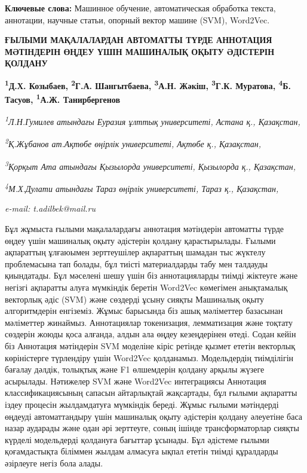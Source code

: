 {\bfseries Ключевые слова:} Машинное обучение, автоматическая обработка
текста, аннотации, научные статьи, опорный вектор машине (SVM),
Word2Vec.

\begin{articleheader}
{\bfseries ҒЫЛЫМИ МАҚАЛАЛАРДАН АВТОМАТТЫ ТҮРДЕ АННОТАЦИЯ МӘТІНДЕРІН ӨҢДЕУ ҮШІН МАШИНАЛЫҚ ОҚЫТУ ӘДІСТЕРІН ҚОЛДАНУ}

{\bfseries
\textsuperscript{1}Д.Х. Козыбаев,
\textsuperscript{2}Г.А. Шангытбаева,
\textsuperscript{3}А.Н. Жәкіш,
\textsuperscript{3}Г.К. Муратова,
\textsuperscript{4}Б. Тасуов,
\textsuperscript{1}А.Ж. Танирбергенов\textsuperscript{\envelope }}
\end{articleheader}

\begin{affiliation}
\emph{\textsuperscript{1}Л.Н.Гумилев атындағы Еуразия ұлттық университеті, Астана қ., Қазақстан,}

\emph{\textsuperscript{2}Қ.Жұбанов ат.Ақтөбе өңірлік университеті, Ақтөбе қ., Қазақстан,}

\emph{\textsuperscript{3}Қорқыт Ата атындағы Қызылорда университеті, Қызылорда қ., Қазақстан,}

\emph{\textsuperscript{4}М.Х.Дулати атындағы Тараз өңірлік университеті, Тараз қ., Қазақстан,}

\emph{e-mail: t.adilbek@mail.ru}
\end{affiliation}

Бұл жұмыста ғылыми мақалалардағы аннотация мәтіндерін автоматты түрде
өңдеу үшін машиналық оқыту әдістерін қолдану қарастырылады. Ғылыми
ақпараттың ұлғаюымен зерттеушілер ақпараттың шамадан тыс жүктелу
проблемасына тап болады, бұл тиісті материалдарды табу мен талдауды
қиындатады. Бұл мәселені шешу үшін біз аннотацияларды тиімді жіктеуге
және негізгі ақпаратты алуға мүмкіндік беретін Word2Vec көмегімен
анықтамалық векторлық әдіс (SVM) және сөздерді ұсыну сияқты Машиналық
оқыту алгоритмдерін енгіземіз. Жұмыс барысында біз ашық мәліметтер
базасынан мәліметтер жинаймыз. Аннотациялар токенизация, лемматизация
және тоқтату сөздерін жоюды қоса алғанда, алдын ала өңдеу кезеңдерінен
өтеді. Содан кейін біз Аннотация мәтіндерін SVM моделіне кіріс ретінде
қызмет ететін векторлық көріністерге түрлендіру үшін Word2Vec
қолданамыз. Модельдердің тиімділігін бағалау дәлдік, толықтық және F1
өлшемдерін қолдану арқылы жүзеге асырылады. Нәтижелер SVM және Word2Vec
интеграциясы Аннотация классификациясының сапасын айтарлықтай
жақсартады, бұл ғылыми ақпаратты іздеу процесін жылдамдатуға мүмкіндік
береді. Жұмыс ғылыми мәтіндерді өңдеуді автоматтандыру үшін машиналық
оқыту әдістерін қолдану әлеуетіне баса назар аударады және одан әрі
зерттеуге, соның ішінде трансформаторлар сияқты күрделі модельдерді
қолдануға бағыттар ұсынады. Бұл әдістеме ғылыми қоғамдастықта біліммен
жылдам алмасуға ықпал ететін тиімді құралдарды әзірлеуге негіз бола
алады.

